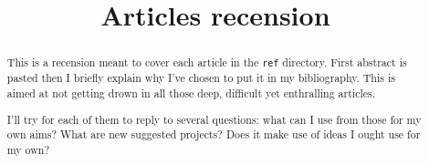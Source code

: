 \documentclass[12pt,onecolumn]{article} %
\title{Articles recension}
\author{}
\begin{document}
\maketitle
\begin{abstract}
\par This is a recension meant to cover each article in the \texttt{ref} directory. First abstract is pasted then I briefly explain why I've chosen to put it in my bibliography. This is aimed at not getting drown in all those deep, difficult yet enthralling articles.\par I'll try for each of them to reply to several questions: what can I use from those for my own aims? What are new suggested projects? Does it make use of ideas I ought use for my own?
\end{abstract}
\end{document}

